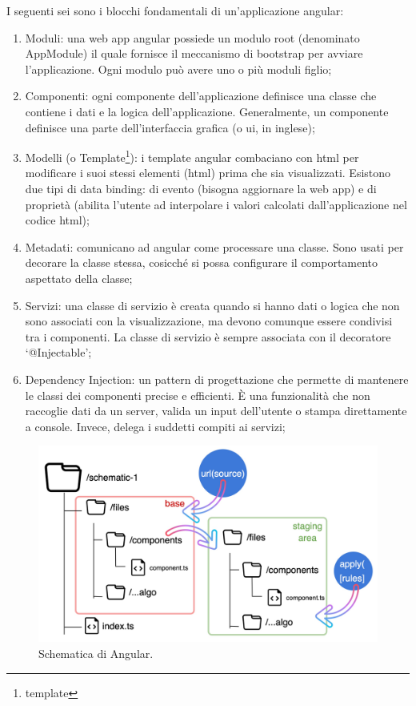 I seguenti sei sono i blocchi fondamentali di un'applicazione \gls{angular}:
\begin{enumerate}
    \item Moduli: una web app \gls{angular} possiede un modulo root (denominato AppModule) il quale fornisce il meccanismo di bootstrap per avviare l'applicazione. Ogni modulo può avere uno o più moduli figlio;
    \item Componenti: ogni componente dell'applicazione definisce una classe che contiene i dati e la logica dell'applicazione. Generalmente, un componente definisce una parte dell'interfaccia grafica (o \acrshort{ui}, in inglese);
    \item Modelli (o Template\footnote{\glsdesc{template}}): i template \gls{angular} combaciano con \acrshort{html} per modificare i suoi stessi elementi (\acrshort{html}) prima che sia visualizzati. Esistono due tipi di data binding: di evento (bisogna aggiornare la web app) e di proprietà (abilita l'utente ad interpolare i valori calcolati dall'applicazione nel codice \acrshort{html});
    \item Metadati: comunicano ad \gls{angular} come processare una classe. Sono usati per decorare la classe stessa, cosicché si possa configurare il comportamento aspettato della classe;
    \item Servizi: una classe di servizio è creata quando si hanno dati o logica che non sono associati con la visualizzazione, ma devono comunque essere condivisi tra i componenti. La classe di servizio è sempre associata con il decoratore `@Injectable';
    \item Dependency Injection: un pattern di progettazione che permette di mantenere le classi dei componenti precise e efficienti. È una funzionalità che non raccoglie dati da un server, valida un input dell'utente o stampa direttamente a console. Invece, delega i suddetti compiti ai servizi;
\end{enumerate}

\begin{figure}[H]
\centering
\includegraphics[width=1\textwidth]{Images/schematic angular.jpg}
\caption{\label{fig:angular schematic}Schematica di Angular.}
\end{figure}


